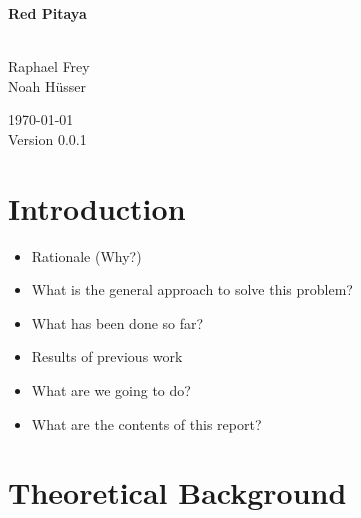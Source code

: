 \documentclass[a4paper,oneside]{alpenthesis/alpenthesis}
\begin{document}
\begin{titlingpage} %
    \flushright\sffamily

    \vspace*{5em}
    \Huge\bfseries{Red Pitaya}\\[1ex]
    \Large{}\\[3ex]

    \normalsize\mdseries
    
    \vfill
    Raphael Frey\\
    Noah H\"usser\\[3ex]

    \vspace{5em}

    \today\\
    Version 0.0.1
\end{titlingpage} %

\frontmatter %
\tableofcontents*
\clearpage
\listoffigures*
\clearpage
\listoftables*
\clearpage
\listoflistings
\clearpage

\mainmatter

\chapter{Introduction} %
\label{ch:intro}



\begin{itemize}\firmlist
    \item Rationale (Why?)
    \item What is the general approach to solve this problem?
    \item What has been done so far?
    \item Results of previous work
    \item What are we going to do?
    \item What are the contents of this report?
\end{itemize}

\cite{1163535}


\chapter{Theoretical Background} %
\label{ch:analog-to-digital_data_aquisition}
\end{document}
